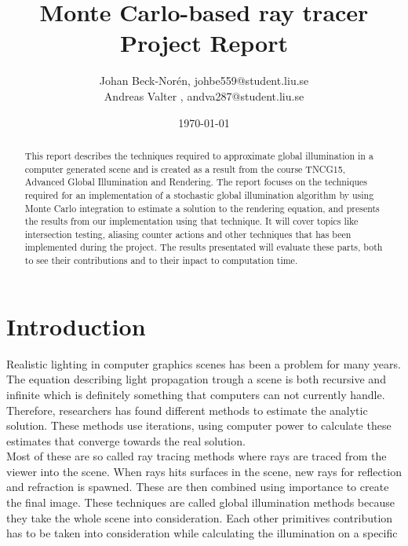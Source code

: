 \documentclass[a4paper, 12pt]{report}
\begin{document}
\title{Monte Carlo-based ray tracer\\ Project Report}   %
\author{
	Johan Beck-Nor\'{e}n, johbe559@student.liu.se
	\\Andreas Valter , andva287@student.liu.se
	}
\date{\today}    %
\maketitle

\setcounter{page}{2}
\begin{abstract}
This report describes the techniques required to approximate global illumination in a computer generated scene and is created as a result from the course TNCG15, Advanced Global Illumination and Rendering.
The report focuses on the techniques required for an implementation of a stochastic global illumination algorithm by using Monte Carlo integration to estimate a solution to the rendering equation, and presents the results from our implementation using that technique.
It will cover topics like intersection testing, aliasing counter actions and other techniques that has been implemented during the project.
The results presentated will evaluate these parts, both to see their contributions and to their inpact to computation time.

\end{abstract}

\tableofcontents


\chapter{Introduction} \label{ch:introduction}
Realistic lighting in computer graphics scenes has been a problem for many years. 
The equation describing light propagation trough a scene is both recursive and infinite which is definitely something that computers can not currently handle.
Therefore, researchers has found different methods to estimate the analytic solution.
These methods use iterations, using computer power to calculate these estimates that converge towards the real solution.\\

Most of these are so called ray tracing methods where rays are traced from the viewer into the scene.
When rays hits surfaces in the scene, new rays for reflection and refraction is spawned.
These are then combined using importance to create the final image.
These techniques are called global illumination methods because they take the whole scene into consideration.
Each other primitives contribution has to be taken into consideration while calculating the illumination on a specific 
\end{document}
